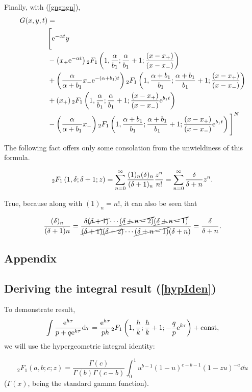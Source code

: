 \noindent
Finally, with (\ref{gngngn}),
\begin{align*}
G(x,y,t) &=\\
 &\Bigg[{\rm e}^{-\alpha t }y\\ 
 &- \left( x_+ {\rm e}^{-\alpha t}\right){}_2 F_1 \left(1,\frac{\alpha}{b_1 };\frac{\alpha}{b_1 }+1; \frac{(x-x_+)}{(x-x_-)}\right)\\
&+\left(\frac{\alpha  }{\alpha + b_1}x_-{\rm e}^{-(\alpha + b_1)t}\right){}_2F_1\left(1,\frac{\alpha + b_1 }{b_1 };\frac{\alpha + b_1 }{b_1 }+1; \frac{(x-x_+)}{(x-x_-)}\right)\\
&+ \left( x_+\right){}_2 F_1 \left(1,\frac{\alpha}{b_1 };\frac{\alpha}{b_1 }+1; \frac{(x-x_+)}{(x-x_-)}{\rm e}^{b_1  t}\right)\\
&- \left(\frac{\alpha  }{\alpha + b_1}x_-\right){}_2F_1\left(1,\frac{\alpha + b_1 }{b_1 };\frac{\alpha + b_1 }{b_1 }+1; \frac{(x-x_+)}{(x-x_-)}{\rm e}^{b_1  t}\right)\Bigg]^N
\end{align*}


The following fact offers only some consolation from the unwieldiness of this formula.

$${}_2F_1\left(1,\delta;\delta+1;z\right) = \sum^\infty_{n=0}\frac{(1)_n(\delta)_n}{(\delta+1)_n}\frac{z^n}{n!} = \sum^\infty_{n=0}\frac{\delta}{\delta+n}{z^n}. $$

True, because along with $(1)_n = n!$, it can also be seen that 

$$\frac{(\delta)_n}{(\delta+1)n} = \frac{\delta\cancel{(\delta+1)}\cdots\cancel{(\delta + n-2)}\cancel{(\delta + n-1)}}{\cancel{(\delta+1)}\cancel{(\delta+2)}\cdots\cancel{(\delta + n-1)}(\delta + n)} = \frac{\delta}{\delta+n}.$$








\subsection*{Appendix}

\subsection{Deriving the integral result (\ref{hypIden})}\label{appxa}
To demonstrate result, 
$$\int\frac{{\rm e}^{h\tau}}{p+q{\rm e}^{k\tau}}{\rm d}\tau= \frac{{\rm e}^{h\tau}}{ph} {}_2F_1\left(1,\frac{h}{k};\frac{h}{k}+1; -\frac{q}{p}{\rm e}^{k\tau}\right) + \text{const},$$
we will use the hypergeometric integral identity:

\begin{equation}
\label{idenHyp}
{}_2F_1(a,b;c;z) = \frac{\Gamma(c)}{\Gamma(b)\Gamma(c-b)}\int^1_0 u^{b-1}(1-u)^{c-b-1}(1-zu)^{-a} \dd u
\end{equation}
($\Gamma(x)$, being the standard gamma function). 

